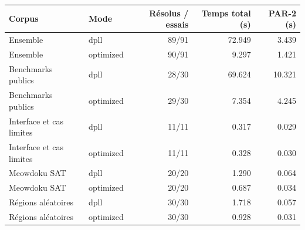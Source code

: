 \begin{tabular}{llrrr}
\toprule
Corpus & Mode & Résolus / essais & Temps total (s) & PAR-2 (s) \\
\midrule
Ensemble & dpll & 89/91 & 72.949 & 3.439 \\
Ensemble & optimized & 90/91 & 9.297 & 1.421 \\
Benchmarks publics & dpll & 28/30 & 69.624 & 10.321 \\
Benchmarks publics & optimized & 29/30 & 7.354 & 4.245 \\
Interface et cas limites & dpll & 11/11 & 0.317 & 0.029 \\
Interface et cas limites & optimized & 11/11 & 0.328 & 0.030 \\
Meowdoku SAT & dpll & 20/20 & 1.290 & 0.064 \\
Meowdoku SAT & optimized & 20/20 & 0.687 & 0.034 \\
Régions aléatoires & dpll & 30/30 & 1.718 & 0.057 \\
Régions aléatoires & optimized & 30/30 & 0.928 & 0.031 \\
\bottomrule
\end{tabular}
